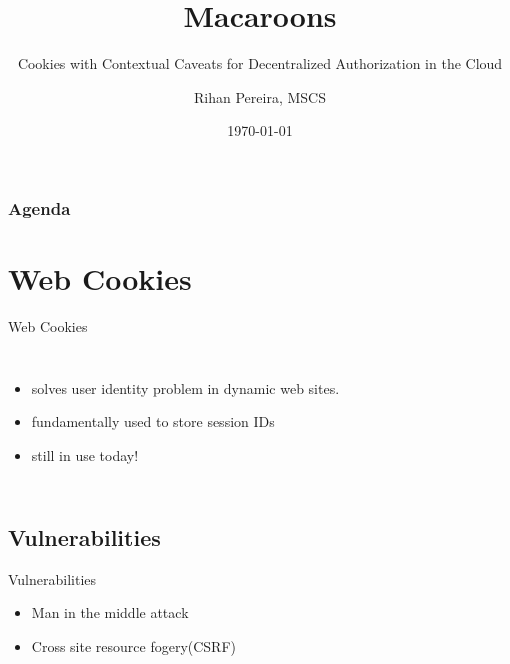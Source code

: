 \documentclass[9pt]{beamer}
\title{Macaroons}
\subtitle{Cookies with Contextual Caveats for Decentralized Authorization in the Cloud}
\author{Rihan Pereira, MSCS}
\institute[California State University, Channel Islands]
{
  COMP 524 - Security, Fall 2018\\
  Department of Computer Science\\
  California State University, Channel Islands
}
\date{\today}
\begin{document}
\begin{frame}[plain]
  \frametitle{}
  \titlepage
\end{frame}

\begin{frame}[plain]
  \frametitle{Agenda}
  \tableofcontents
\end{frame}


\section{Web Cookies}
\begin{frame}{Web Cookies}
  \begin{columns}
    \begin{itemize}
    \item solves user identity problem in dynamic web sites.
      \pause
    \item fundamentally used to store session IDs
      \pause
    \item still in use today!
    \end{itemize}

    
  \end{columns}
\end{frame}

\begin{frame}
\end{frame}


\subsection{Vulnerabilities}
\begin{frame}{Vulnerabilities}
  \begin{itemize}
    \item Man in the middle attack
    \item Cross site resource fogery(CSRF)
  \end{itemize}
\end{frame}
\end{document}
